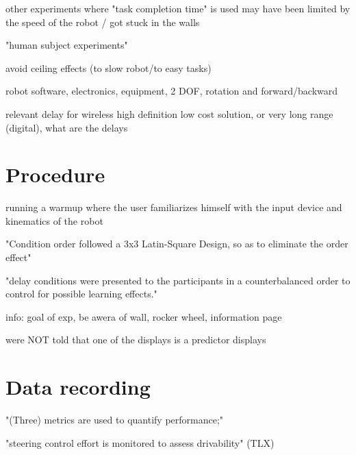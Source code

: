 other experiments where "task completion time" is used may have been limited by the speed of the robot / got stuck in the walls

"human subject experiments"

avoid ceiling effects (to slow robot/to easy tasks)

robot software, electronics, equipment, 2 DOF, rotation and forward/backward

relevant delay for wireless high definition low cost solution, or very long range (digital), what are the delays


\section{Procedure}

running a warmup where the user familiarizes himself with the input device and kinematics of the robot

\citep{Lu2018} "Condition order followed a 3x3 Latin-Square Design, so as to eliminate the order effect"

"delay conditions were presented to the participants in a counterbalanced order to control for possible learning effects."

info: goal of exp, be awera of wall, rocker wheel, information page

were NOT told that one of the displays is a predictor displays


\section{Data recording}

"(Three) metrics are used to quantify performance;"

"steering control effort is monitored to assess drivability" (TLX)


